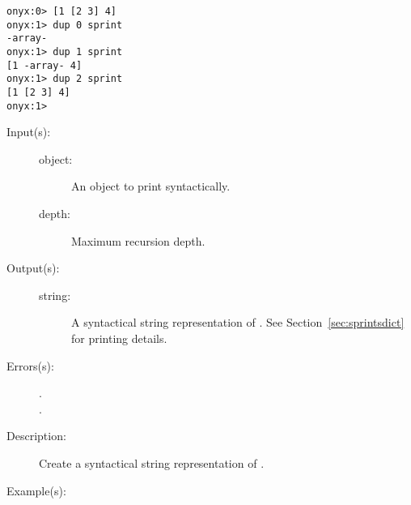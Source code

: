 \begin{description}
\begin{description}
\begin{verbatim}
onyx:0> [1 [2 3] 4]
onyx:1> dup 0 sprint
-array-
onyx:1> dup 1 sprint
[1 -array- 4]
onyx:1> dup 2 sprint
[1 [2 3] 4]
onyx:1>
		\end{verbatim}
	\end{description}
\label{systemdict:sprints}
\item[{\onyxop{object depth}{sprints}{string}}: ]
	\begin{description}\item[]
	\item[Input(s): ]
		\begin{description}\item[]
		\item[object: ]
			An object to print syntactically.
		\item[depth: ]
			Maximum recursion depth.
		\end{description}
	\item[Output(s): ]
		\begin{description}\item[]
		\item[string: ]
			A syntactical string representation of .
			See Section~\ref{sec:sprintsdict} for printing details.
		\end{description}
	\item[Errors(s): ]
		\begin{description}\item[]
		\item[.]
		\item[.]
		\end{description}
	\item[Description: ]
		Create a syntactical string representation of .
	\item[Example(s): ]\begin{verbatim}


\end{verbatim}
\end{description}
\end{description}
